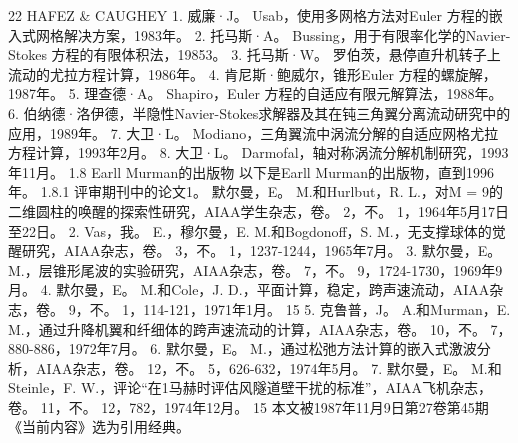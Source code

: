 \documentclass[UTF8,11pt,a4paper,openany,fontset=fandol]{ctexbook}
\begin{document}
22 HAFEZ \& CAUGHEY 1. 威廉·J。 Usab，使用多网格方法对Euler 方程的嵌入式网格解决方案，1983年。 2. 托马斯·A。 Bussing，用于有限率化学的Navier-Stokes 方程的有限体积法，19853。 3. 托马斯·W。 罗伯茨，悬停直升机转子上流动的尤拉方程计算，1986年。 4. 肯尼斯·鲍威尔，锥形Euler 方程的螺旋解，1987年。 5. 理查德·A。 Shapiro，Euler 方程的自适应有限元解算法，1988年。 6. 伯纳德·洛伊德，半隐性Navier-Stokes求解器及其在钝三角翼分离流动研究中的应用，1989年。 7. 大卫·L。 Modiano，三角翼流中涡流分解的自适应网格尤拉方程计算，1993年2月。 8. 大卫·L。 Darmofal，轴对称涡流分解机制研究，1993年11月。 1.8 Earll Murman的出版物 以下是Earll Murman的出版物，直到1996年。 1.8.1 评审期刊中的论文1。 默尔曼，E。 M.和Hurlbut，R. L.，对M = 9的二维圆柱的唤醒的探索性研究，AIAA学生杂志，卷。 2，不。 1，1964年5月17日至22日。 2. Vas，我。 E.，穆尔曼，E. M.和Bogdonoff，S. M.，无支撑球体的觉醒研究，AIAA杂志，卷。 3，不。 1，1237-1244，1965年7月。 3. 默尔曼，E。 M.，层锥形尾波的实验研究，AIAA杂志，卷。 7，不。 9，1724-1730，1969年9月。 4. 默尔曼，E。 M.和Cole，J. D.，平面计算，稳定，跨声速流动，AIAA杂志，卷。 9，不。 1，114-121，1971年1月。 15 5. 克鲁普，J。 A.和Murman，E. M.，通过升降机翼和纤细体的跨声速流动的计算，AIAA杂志，卷。 10，不。 7，880-886，1972年7月。 6. 默尔曼，E。 M.，通过松弛方法计算的嵌入式激波分析，AIAA杂志，卷。 12，不。 5，626-632，1974年5月。 7. 默尔曼，E。 M.和Steinle，F. W.，评论“在1马赫时评估风隧道壁干扰的标准”，AIAA飞机杂志，卷。 11，不。 12，782，1974年12月。 15 本文被1987年11月9日第27卷第45期《当前内容》选为引用经典。
\end{document}
